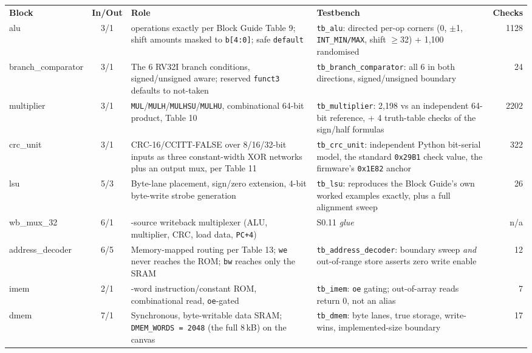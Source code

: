 \documentclass[11pt,a4paper]{article}
\newcommand{\ub}{\_\discretionary{}{}{}}     %
\newcommand{\hrow}{\rowcolor{rvbltint}}
\begin{document}
\vspace{6pt}

{\footnotesize
\begin{tabularx}{\linewidth}{>{\ttfamily\scriptsize}p{2.05cm}c>{\raggedright\arraybackslash}X>{\raggedright\arraybackslash}p{4.35cm}r}
\multicolumn{5}{l}{\normalsize\bfseries\color{rvbl}Table \thetable b\quad
  Execution, memory and interconnect blocks}\\[2pt]
\toprule
\hrow \normalfont\bfseries Block & \bfseries In/Out & \bfseries Role &
\bfseries Testbench & \bfseries Checks \\
\midrule
alu & 3/1 & 11 operations exactly per Block Guide Table 9; shift amounts masked to
  \texttt{b[4:0]}; safe \texttt{default} & \texttt{tb\_alu}: directed per-op corners
  (0, $\pm$1, \texttt{INT\_MIN/MAX}, shift $\ge$32) + 1{,}100 randomised & 1128 \\
branch\ub comparator & 3/1 & The 6 RV32I branch conditions, signed/unsigned aware; reserved
  \texttt{funct3} defaults to not-taken & \texttt{tb\_branch\_comparator}: all 6 in both
  directions, signed/unsigned boundary & 24 \\
multiplier & 3/1 & \texttt{MUL}/\texttt{MULH}/\texttt{MULHSU}/\texttt{MULHU},
  combinational 64-bit product, Table 10 & \texttt{tb\_multiplier}: 2{,}198 vs an
  independent 64-bit reference, + 4 truth-table checks of the sign/half formulas & 2202 \\
crc\_unit & 3/1 & CRC-16/CCITT-FALSE over 8/16/32-bit inputs as three constant-width XOR
  networks plus an output mux, per Table 11 & \texttt{tb\_crc\_unit}: independent Python
  bit-serial model, the standard \texttt{0x29B1} check value, the firmware's
  \texttt{0x1E82} anchor & 322 \\
lsu & 5/3 & Byte-lane placement, sign/zero extension, 4-bit byte-write strobe generation &
  \texttt{tb\_lsu}: reproduces the Block Guide's own worked examples exactly, plus a
  full alignment sweep & 26 \\
wb\_mux\_32 & 6/1 & 5-source writeback multiplexer (ALU, multiplier, CRC, load data,
  \texttt{PC+4}) & S0.11 \emph{glue} & n/a \\
address\ub decoder & 6/5 & Memory-mapped routing per Table 13; \texttt{we} never reaches the
  ROM; \texttt{bw} reaches only the SRAM & \texttt{tb\_address\_decoder}: boundary sweep
  \emph{and} out-of-range store asserts zero write enable & 12 \\
imem & 2/1 & 742-word instruction/constant ROM, combinational read, \texttt{oe}-gated &
  \texttt{tb\_imem}: \texttt{oe} gating; out-of-array reads return 0, not an alias & 7 \\
dmem & 7/1 & Synchronous, byte-writable data SRAM; \texttt{DMEM\_WORDS = 2048} (the full
  8\,kB) on the canvas & \texttt{tb\_dmem}: byte lanes, true storage, write-wins,
  implemented-size boundary & 17 \\
\bottomrule
\end{tabularx}}
\end{document}
